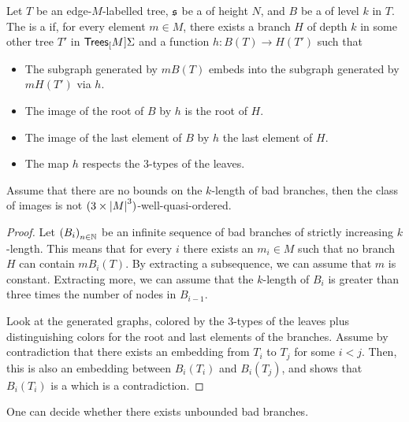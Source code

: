 \begin{definition}
    \label{good-bough:def}
    Let $T$ be an edge-$M$-labelled tree, $\mathfrak{s}$ be a 
    of height $N$, and $B$ be a  of level $k$ in $T$.
    The  is a  if, for every element $m \in M$,
    there exists a branch $H$ of depth $k$ in some other tree $T'$ in $\mathsf{Trees}_{[}M]{\Sigma}$
    and a function $h \colon B(T) \to H(T')$ such that
    \begin{itemize}
        \item The subgraph generated by $m B(T)$ embeds into the subgraph generated by $m H(T')$ via $h$.
        \item The image of the root of $B$ by $h$ is the root of $H$.
        \item The image of the last element of $B$ by $h$ the last element of $H$.
        \item The map $h$ respects the $3$-types of the leaves.
    \end{itemize}
\end{definition}

\begin{lemma}
    Assume that there are no bounds on the $k$-length of bad branches, then 
    the class of images is not $(3 \times \left| M \right|^3)$-well-quasi-ordered.
\end{lemma}
\begin{proof}
    Let $\seqof{B_i}$ be an infinite sequence of bad branches of strictly increasing $k$-length.
    This means that for every $i$ there exists an $m_i \in M$ such that
    no branch $H$ can contain $m B_i(T)$. By extracting a subsequence, we can assume that $m$ is constant.
    Extracting more, we can assume that the $k$-length of $B_i$ is greater than three times the
    number of nodes in $B_{i-1}$.

    Look at the generated graphs, colored by the $3$-types of the leaves plus
    distinguishing colors for the root and last elements of the branches. Assume by contradiction that
    there exists an embedding from $T_i$ to $T_j$ for some $i < j$. Then,
    this is also an embedding between $B_i(T_i)$ and $B_i(T_j)$, and
    shows that $B_i(T_i)$ is a  which is a contradiction.
\end{proof}

\begin{lemma}
    One can decide whether there exists unbounded
    bad branches.
\end{lemma}

